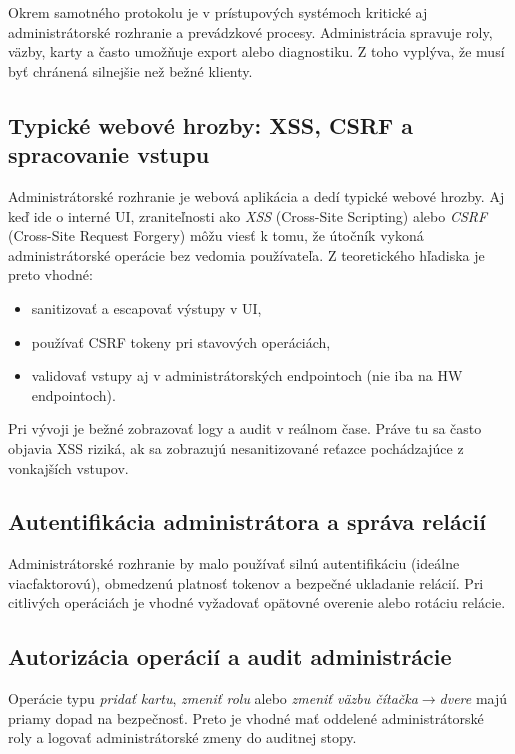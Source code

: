 \documentclass[journal,a4paper,onecolumn]{IEEEtran}
\begin{document}
Okrem samotného protokolu je v prístupových systémoch kritické aj administrátorské rozhranie a prevádzkové procesy. Administrácia spravuje roly, väzby, karty a často umožňuje export alebo diagnostiku. Z toho vyplýva, že musí byť chránená silnejšie než bežné klienty.

\subsection{Typické webové hrozby: XSS, CSRF a spracovanie vstupu}

Administrátorské rozhranie je webová aplikácia a dedí typické webové hrozby. Aj keď ide o interné UI, zraniteľnosti ako \emph{XSS} (Cross-Site Scripting) alebo \emph{CSRF} (Cross-Site Request Forgery) môžu viesť k tomu, že útočník vykoná administrátorské operácie bez vedomia používateľa. Z teoretického hľadiska je preto vhodné:

\begin{itemize}[leftmargin=*,itemsep=2pt]
  \item sanitizovať a escapovať výstupy v UI,
  \item používať CSRF tokeny pri stavových operáciách,
  \item validovať vstupy aj v administrátorských endpointoch (nie iba na HW endpointoch).
\end{itemize}

Pri vývoji je bežné zobrazovať logy a audit v reálnom čase. Práve tu sa často objavia XSS riziká, ak sa zobrazujú nesanitizované reťazce pochádzajúce z vonkajších vstupov.


\subsection{Autentifikácia administrátora a správa relácií}

Administrátorské rozhranie by malo používať silnú autentifikáciu (ideálne viacfaktorovú), obmedzenú platnosť tokenov a bezpečné ukladanie relácií. Pri citlivých operáciách je vhodné vyžadovať opätovné overenie alebo rotáciu relácie.

\subsection{Autorizácia operácií a audit administrácie}

Operácie typu \emph{pridať kartu}, \emph{zmeniť rolu} alebo \emph{zmeniť väzbu čítačka$\rightarrow$dvere} majú priamy dopad na bezpečnosť. Preto je vhodné mať oddelené administrátorské roly a logovať administrátorské zmeny do auditnej stopy.
\end{document}

